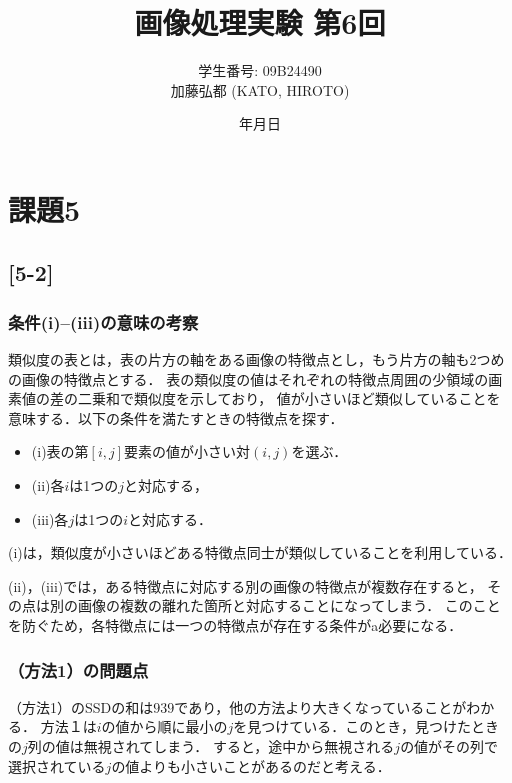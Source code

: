\documentclass[autodetect-engine,dvi=dvipdfmx,ja=standard,
               a4j,11pt]{bxjsarticle}
\title{画像処理実験 第6回}
\author{学生番号: 09B24490\\
        加藤弘都 (KATO, HIROTO)}
\date{\number\year 年\number\month 月\number\day 日}
\begin{document}
\maketitle

\section{課題5} \label{sec:abstract}

\subsection{[5-2]} 

\subsubsection{条件(i)–(iii)の意味の考察}

類似度の表とは，表の片方の軸をある画像の特徴点とし，もう片方の軸も2つめの画像の特徴点とする．
表の類似度の値はそれぞれの特徴点周囲の少領域の画素値の差の二乗和で類似度を示しており，
値が小さいほど類似していることを意味する．以下の条件を満たすときの特徴点を探す．

\begin{itemize}
    \item (i)表の第$[i,j]$要素の値が小さい対$(i,j)$を選ぶ．
    \item (ii)各$i$は1つの$j$と対応する，
    \item (iii)各$j$は1つの$i$と対応する．
\end{itemize}

(i)は，類似度が小さいほどある特徴点同士が類似していることを利用している．

(ii)，(iii)では，ある特徴点に対応する別の画像の特徴点が複数存在すると，
その点は別の画像の複数の離れた箇所と対応することになってしまう．
このことを防ぐため，各特徴点には一つの特徴点が存在する条件がa必要になる．


\subsubsection{（方法1）の問題点}

（方法1）のSSDの和は$939$であり，他の方法より大きくなっていることがわかる．
方法１は$i$の値から順に最小の$j$を見つけている．このとき，見つけたときの$j$列の値は無視されてしまう．
すると，途中から無視される$j$の値がその列で選択されている$j$の値よりも小さいことがあるのだと考える．
\end{document}

